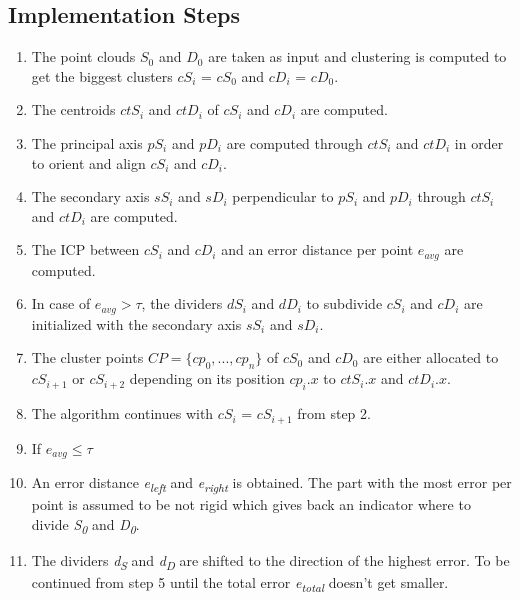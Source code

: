 \documentclass[notitlepage,english]{hgbreport}
\begin{document}
\subsection{Implementation Steps}

\begin{enumerate}
	\item The point clouds $S_0$ and $D_0$ are taken as input and clustering is computed to get the biggest clusters $cS_i$ = $cS_0$ and $cD_i$ = $cD_0$.
	
	\item The centroids $ctS_i$ and $ctD_i$ of $cS_i$ and $cD_i$ are computed.
	
	\item The principal axis $pS_i$ and $pD_i$ are computed through $ctS_i$ and $ctD_i$ in order to orient and align $cS_i$ and $cD_i$.
	
	\item The secondary axis $sS_i$ and $sD_i$ perpendicular to $pS_i$ and $pD_i$ through $ctS_i$ and $ctD_i$ are computed.
	
	\item The ICP between $cS_i$ and $cD_i$ and an error distance per point $e_{avg}$ are computed. 
	
	\item In case of $e_{avg} > \tau$, the dividers $dS_i$ and $dD_i$ to subdivide $cS_i$ and $cD_i$ are initialized with the secondary axis $sS_i$ and $sD_i$.
	
	\item The cluster points $ CP =  \{ {cp_0, ..., cp_n}\}$ of $cS_0$ and $cD_0$  are either allocated to $cS_{i + 1}$ or $cS_{i + 2}$ depending on its position $cp_i.x$ to $ctS_i.x$ and $ctD_i.x$. 
	
	\item The algorithm continues with $cS_i$ = $cS_{i + 1}$ from step 2.
	
	\item If $e_{avg} \le \tau$
	
	\item An error distance \textit{e\textsubscript{left}} and \textit{e\textsubscript{right}} is obtained. The part with the most error per point is assumed to be not rigid which gives back an indicator where to divide \textit{S\textsubscript{0}} and \textit{D\textsubscript{0}}.
	
	\item The dividers \textit{d\textsubscript{S}} and \textit{d\textsubscript{D}} are shifted to the direction of the highest error. To be continued from step 5 until the total error \textit{e\textsubscript{total}} doesn't get smaller.
\end{enumerate}
\end{document}
